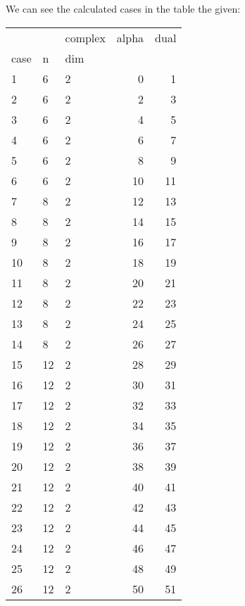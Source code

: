 \documentclass{article}
\begin{document}
\par We can see the calculated cases in the table the given:
\begin{center}
\begin{tabular}{lllrr}
\toprule
&  & complex & alpha & dual \\
case & n & dim &  &  \\
\midrule
1 & 6 & 2 & 0 & 1 \\
\cline{1-5} \cline{2-5}
2 & 6 & 2 & 2 & 3 \\
\cline{1-5} \cline{2-5}
3 & 6 & 2 & 4 & 5 \\
\cline{1-5} \cline{2-5}
4 & 6 & 2 & 6 & 7 \\
\cline{1-5} \cline{2-5}
5 & 6 & 2 & 8 & 9 \\
\cline{1-5} \cline{2-5}
6 & 6 & 2 & 10 & 11 \\
\cline{1-5} \cline{2-5}
7 & 8 & 2 & 12 & 13 \\
\cline{1-5} \cline{2-5}
8 & 8 & 2 & 14 & 15 \\
\cline{1-5} \cline{2-5}
9 & 8 & 2 & 16 & 17 \\
\cline{1-5} \cline{2-5}
10 & 8 & 2 & 18 & 19 \\
\cline{1-5} \cline{2-5}
11 & 8 & 2 & 20 & 21 \\
\cline{1-5} \cline{2-5}
12 & 8 & 2 & 22 & 23 \\
\cline{1-5} \cline{2-5}
13 & 8 & 2 & 24 & 25 \\
\cline{1-5} \cline{2-5}
14 & 8 & 2 & 26 & 27 \\
\cline{1-5} \cline{2-5}
15 & 12 & 2 & 28 & 29 \\
\cline{1-5} \cline{2-5}
16 & 12 & 2 & 30 & 31 \\
\cline{1-5} \cline{2-5}
17 & 12 & 2 & 32 & 33 \\
\cline{1-5} \cline{2-5}
18 & 12 & 2 & 34 & 35 \\
\cline{1-5} \cline{2-5}
19 & 12 & 2 & 36 & 37 \\
\cline{1-5} \cline{2-5}
20 & 12 & 2 & 38 & 39 \\
\cline{1-5} \cline{2-5}
21 & 12 & 2 & 40 & 41 \\
\cline{1-5} \cline{2-5}
22 & 12 & 2 & 42 & 43 \\
\cline{1-5} \cline{2-5}
23 & 12 & 2 & 44 & 45 \\
\cline{1-5} \cline{2-5}
24 & 12 & 2 & 46 & 47 \\
\cline{1-5} \cline{2-5}
25 & 12 & 2 & 48 & 49 \\
\cline{1-5} \cline{2-5}
26 & 12 & 2 & 50 & 51 \\

\end{tabular}
\end{center}
\end{document}
